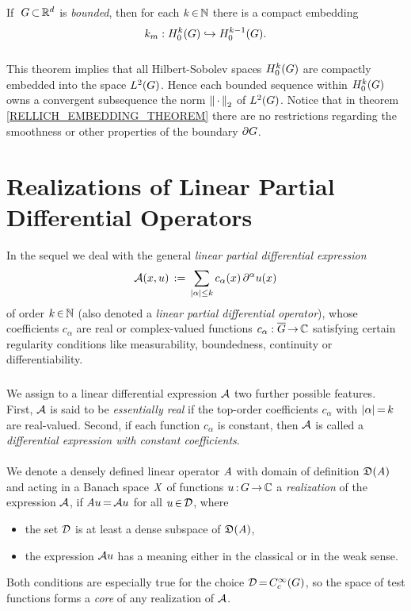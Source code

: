 \documentclass[11pt,twoside]{article}
\begin{document}
\begin{theorem}\label{RELLICH_EMBEDDING_THEOREM}
If $\; \G \xsubset \Rd$ is \textit{bounded},
then for each $k \xeof \N$ there is a compact embedding
\[
\compA_m:\HN{k}{\G} \hookrightarrow \HN{k-1}{\G}.
\]
\end{theorem}

\subparagraph*{}
This theorem implies
that all Hilbert-Sobolev spaces $\HN{k}{\G}$ are compactly embedded
into the space $\Lh$.
Hence each bounded sequence within $\HN{k}{\G}$ owns a convergent subsequence
{\wrt} the norm $\norm{\,\cdot\,}_2$ of $\Lh$.
Notice that in theorem \ref{RELLICH_EMBEDDING_THEOREM}
there are no restrictions regarding the smoothness
or other properties of the boundary $\bndG$.

\section{Realizations of Linear Partial Differential Operators}
In the sequel
we deal with the general \textit{linear partial differential expression}
\begin{equation}\label{LPDO}
\DO(x,u) \eqdef
\sum_{\abs{\alpha} \leq k} c_{\alpha}(x) \, \PA u(x)
\end{equation}
of order $k \xeof \N$
(also denoted a \textit{linear partial differential operator}),
whose coefficients $c_{\alpha}$ are real or complex-valued
functions $c_{\alpha}:\clG \xto \C$
satisfying certain regularity conditions
like measurability, boundedness, continuity or differentiability.

\subparagraph*{}
We assign to a linear differential expression $\DO$
two further possible features.
First,
$\DO$ is said to be \textit{essentially real}
if the top-order coefficients $c_{\alpha}$ with $\abs{\alpha} \eq k$
are real-valued.
Second,
if each function $c_{\alpha}$ is constant,
then $\DO$ is called a
\textit{differential expression with constant coefficients}.

\paragraph*{}
We denote a densely defined linear operator $\linA$
with domain of definition $\domain{\linA}$
and acting in a Banach space $\banX$ of functions $u\:\G \xto \C$
a \textit{realization} of the expression $\DO$,
if $\linA u \eq \DO u$ for all $u \xeof \cal{D}$,
where
\begin{itemize}[leftmargin=12pt]
\item[1.]
the set $\cal{D}$ is at least a dense subspace of $\domain{\linA}$,
\item[2.]
the expression $\DO u$ has a meaning either in the classical
or in the weak sense.
\end{itemize}
Both conditions are especially true for the choice $\cal{D} \eq \TF$,
so the space of test functions forms a \textit{core} of any
realization of $\DO$.
\end{document}
